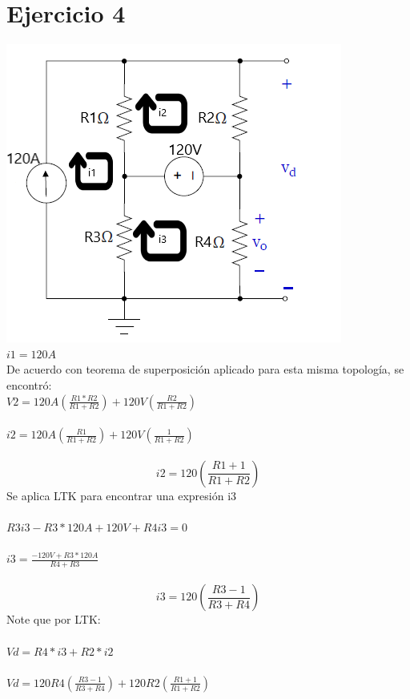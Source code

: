 \documentclass{article}
\begin{document}
\section{Ejercicio 4}
\includegraphics[]{images/ejercicio3.PNG} \\
$i1 = 120A$\\
De acuerdo con teorema de superposición aplicado para esta misma topología, se encontró:\\
$V2 = 120A(\frac{R1*R2}{R1+R2}) + 120V(\frac{R2}{R1+R2})$ \\ \\
$i2 =   120A(\frac{R1}{R1+R2}) + 120V(\frac{1}{R1+R2})$\\  \\
\begin{equation}
    i2 = 120(\frac{R1 + 1}{R1 + R2})
\end{equation}
Se aplica LTK para encontrar una expresión i3\\ \\
$R3i3 -R3*120A + 120V +R4i3 =0$\\ \\
$ i3= \frac{-120V+R3*120A}{R4+R3}$ \\ \\
\begin{equation}
    i3 = 120(\frac{R3 -1}{R3 + R4})
\end{equation}
Note que por LTK: \\ \\
$Vd = R4*i3 + R2*i2$ \\ \\
$Vd = 120R4(\frac{R3 - 1}{R3 + R4}) + 120R2(\frac{R1 + 1}{R1 + R2})$ \\ \\
\end{document}
